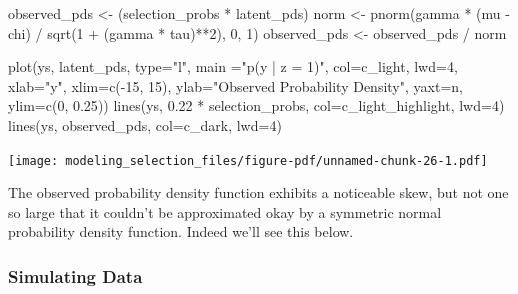 \documentclass[
  letterpaper,
  DIV=11,
  numbers=noendperiod]{scrartcl}
\newenvironment{Shaded}{\begin{snugshade}}{\end{snugshade}}
\newcommand{\AttributeTok}[1]{\textcolor[rgb]{0.40,0.45,0.13}{#1}}
\newcommand{\DecValTok}[1]{\textcolor[rgb]{0.68,0.00,0.00}{#1}}
\newcommand{\FloatTok}[1]{\textcolor[rgb]{0.68,0.00,0.00}{#1}}
\newcommand{\FunctionTok}[1]{\textcolor[rgb]{0.28,0.35,0.67}{#1}}
\newcommand{\NormalTok}[1]{\textcolor[rgb]{0.00,0.23,0.31}{#1}}
\newcommand{\OtherTok}[1]{\textcolor[rgb]{0.00,0.23,0.31}{#1}}
\newcommand{\SpecialCharTok}[1]{\textcolor[rgb]{0.37,0.37,0.37}{#1}}
\newcommand{\StringTok}[1]{\textcolor[rgb]{0.13,0.47,0.30}{#1}}
\begin{document}
\begin{Shaded}
\begin{Highlighting}[]
\NormalTok{observed\_pds }\OtherTok{\textless{}{-}}\NormalTok{ (selection\_probs }\SpecialCharTok{*}\NormalTok{ latent\_pds)}
\NormalTok{norm }\OtherTok{\textless{}{-}} \FunctionTok{pnorm}\NormalTok{(gamma }\SpecialCharTok{*}\NormalTok{ (mu }\SpecialCharTok{{-}}\NormalTok{ chi) }\SpecialCharTok{/} \FunctionTok{sqrt}\NormalTok{(}\DecValTok{1} \SpecialCharTok{+}\NormalTok{ (gamma }\SpecialCharTok{*}\NormalTok{ tau)}\SpecialCharTok{**}\DecValTok{2}\NormalTok{), }\DecValTok{0}\NormalTok{, }\DecValTok{1}\NormalTok{)}
\NormalTok{observed\_pds }\OtherTok{\textless{}{-}}\NormalTok{ observed\_pds }\SpecialCharTok{/}\NormalTok{ norm}

\FunctionTok{plot}\NormalTok{(ys, latent\_pds, }\AttributeTok{type=}\StringTok{"l"}\NormalTok{, }\AttributeTok{main =}\StringTok{"p(y | z = 1)"}\NormalTok{, }\AttributeTok{col=}\NormalTok{c\_light, }\AttributeTok{lwd=}\DecValTok{4}\NormalTok{,}
     \AttributeTok{xlab=}\StringTok{"y"}\NormalTok{, }\AttributeTok{xlim=}\FunctionTok{c}\NormalTok{(}\SpecialCharTok{{-}}\DecValTok{15}\NormalTok{, }\DecValTok{15}\NormalTok{),}
     \AttributeTok{ylab=}\StringTok{"Observed Probability Density"}\NormalTok{, }\AttributeTok{yaxt=}\StringTok{\textquotesingle{}n\textquotesingle{}}\NormalTok{, }\AttributeTok{ylim=}\FunctionTok{c}\NormalTok{(}\DecValTok{0}\NormalTok{, }\FloatTok{0.25}\NormalTok{))}
\FunctionTok{lines}\NormalTok{(ys, }\FloatTok{0.22} \SpecialCharTok{*}\NormalTok{ selection\_probs, }\AttributeTok{col=}\NormalTok{c\_light\_highlight, }\AttributeTok{lwd=}\DecValTok{4}\NormalTok{)}
\FunctionTok{lines}\NormalTok{(ys, observed\_pds, }\AttributeTok{col=}\NormalTok{c\_dark, }\AttributeTok{lwd=}\DecValTok{4}\NormalTok{)}
\end{Highlighting}
\end{Shaded}

\texttt{[image: modeling\_selection\_files/figure-pdf/unnamed-chunk-26-1.pdf]}

The observed probability density function exhibits a noticeable skew,
but not one so large that it couldn't be approximated okay by a
symmetric normal probability density function. Indeed we'll see this
below.

\subsubsection{Simulating Data}\label{simulating-data-1}
\end{document}
